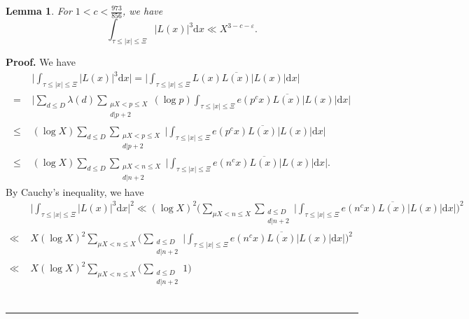 \documentclass[a4paper,oneside,11pt]{article}%
\newtheorem{lemma}[theorem]{Lemma}
\newenvironment{proof}[1][Proof]{\noindent \textbf{#1.} }{\  \rule{0.5em}{0.5em}}
\numberwithin{equation}{section}
\begin{document}
\begin{lemma}\label{inte-minor}
  For $1<c<\frac{973}{856}$, we have
\begin{equation*}
   \int_{\tau\leqslant|x|\leqslant\Xi}\big|L(x)\big|^3\mathrm{d}x\ll X^{3-c-\varepsilon}.
\end{equation*}
\end{lemma}
\begin{proof}
We have
\begin{align*}
  & \,\, \bigg|\int_{\tau\leqslant|x|\leqslant\Xi}\big|L(x)\big|^3\mathrm{d}x\bigg|
         =\bigg|\int_{\tau\leqslant|x|\leqslant\Xi}L(x)\overline{L(x)}\big|L(x)\big|\mathrm{d}x\bigg|
               \nonumber \\
= & \,\, \Bigg|\sum_{d\leqslant D}\lambda(d)\sum_{\substack{\mu X<p\leqslant X\\ d|p+2}}(\log p)
         \int_{\tau\leqslant|x|\leqslant\Xi}e(p^cx)\overline{L(x)}\big|L(x)\big|\mathrm{d}x\Bigg|
                \nonumber \\
\leqslant & \,\,(\log X)\sum_{d\leqslant D}\sum_{\substack{\mu X<p\leqslant X\\ d|p+2}}
                \Bigg|\int_{\tau\leqslant|x|\leqslant\Xi}e(p^cx)\overline{L(x)}\big|L(x)\big|\mathrm{d}x\Bigg|
                 \nonumber \\
\leqslant & \,\,(\log X)\sum_{d\leqslant D}\sum_{\substack{\mu X<n\leqslant X\\ d|n+2}}
                \Bigg|\int_{\tau\leqslant|x|\leqslant\Xi}e(n^cx)\overline{L(x)}\big|L(x)\big|\mathrm{d}x\Bigg|.
\end{align*}
By Cauchy's inequality, we have
\begin{align}\label{inte-1}
      & \,\,     \bigg|\int_{\tau\leqslant|x|\leqslant\Xi}\big|L(x)\big|^3\mathrm{d}x\bigg|^2
\ll  (\log X)^2\Bigg(\sum_{\mu X<n\leqslant X}\sum_{\substack{d\leqslant D\\ d|n+2}}
           \bigg|\int_{\tau\leqslant|x|\leqslant\Xi}e(n^cx)\overline{L(x)}\big|L(x)\big|\mathrm{d}x\bigg|\Bigg)^2
                  \nonumber \\
\ll & \,\, X(\log X)^2\sum_{\mu X<n\leqslant X}\Bigg(\sum_{\substack{d\leqslant D\\ d|n+2}}
           \bigg|\int_{\tau\leqslant|x|\leqslant\Xi}e(n^cx)\overline{L(x)}\big|L(x)\big|\mathrm{d}x\bigg|\Bigg)^2
                  \nonumber \\
\ll & \,\, X(\log X)^2 \sum_{\mu X<n\leqslant X}\Bigg(\sum_{\substack{d\leqslant D\\ d|n+2}}1\Bigg)

\end{align}
\end{proof}
\end{document}
